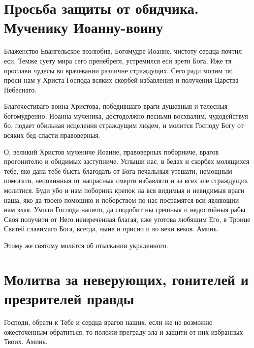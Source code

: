\section{Просьба защиты от обидчика. Мученику Иоанну-воину}\begin{mymulticols}
 


Блаженство Евангельское возлюбив, Богомудре Иоанне, чистоту сердца почтил еси. Темже суету мира сего пренебрегл, устремился еси зрети Бога, Иже тя прослави чудесы во врачевании различне страждущих. Сего ради молим тя: проси нам у Христа Господа всяких скорбей избавления и получения Царства Небеснаго.


Благочестиваго воина Христова, победившаго враги душевныя и телесныя богомудренно, Иоанна мученика, достодолжно песньми восхвалим, чудодействуя бо, подает обильная исцеления страждущим людем, и молится Господу Богу от всяких бед спасти правоверныя.


О, великий Христов мучениче Иоанне, правоверных поборниче, врагов прогонителю и обидимых заступниче. Услыши нас, в бедах и скорбях молящихся тебе, яко дана тебе бысть благодать от Бога печальныя утешати, немощным помогати, неповинныя от напрасныя смерти избавляти и за всех зле страждущих молитися. Буди убо и нам поборник крепок на вся видимыя и невидимыя враги наша, яко да твоею помощию и поборством по нас посрамятся вси являющии нам злая. Умоли Господа нашего, да сподобит ны грешныя и недостойныя рабы Своя получити от Него неизреченная благая, яже уготова любящим Его, в Троице Святей славимаго Бога, всегда, ныне и присно и во веки веков. Аминь. 

\itshape 

Этому же святому молятся об отыскании украденного.\normalfont{}

\end{mymulticols}

\section{Молитва за неверующих, гонителей и презрителей правды}\begin{mymulticols}
 

Господи, обрати к Тебе и сердца врагов наших, если же не возможно ожесточенным обратиться, то положи преграду зла и защити от них избранных Твоих. Аминь.

\end{mymulticols}

